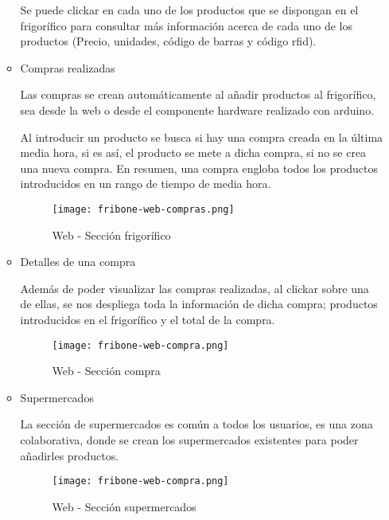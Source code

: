 \begin{itemize}
\begin{itemize}
                Se puede clickar en cada uno de los productos que se dispongan en el frigorífico para consultar más información acerca de cada uno de los productos (Precio, unidades, código de barras y código rfid).

                \item Compras realizadas

                Las compras se crean automáticamente al añadir productos al frigorífico, sea desde la web o desde el componente hardware realizado con arduino.

                Al introducir un producto se busca si hay una compra creada en la última media hora, si es así, el producto se mete a dicha compra, si no se crea una nueva compra. En resumen, una compra engloba todos los productos introducidos en un rango de tiempo de media hora.

                \begin{figure}[H]
                    \centering
                    \texttt{[image: fribone-web-compras.png]}
                    \caption{Web - Sección frigorífico}\label{fig:fribone-web-comras}
                \end{figure}

                \item Detalles de una compra

                Además de poder visualizar las compras realizadas, al clickar sobre una de ellas, se nos despliega toda la información de dicha compra; productos introducidos en el frigorífico y el total de la compra.

                \begin{figure}[H]
                    \centering
                    \texttt{[image: fribone-web-compra.png]}
                    \caption{Web - Sección compra}\label{fig:fribone-web-compra}
                \end{figure}

                \item Supermercados

                    La sección de supermercados es común a todos los usuarios, es una zona colaborativa, donde se crean los supermercados existentes para poder añadirles productos.

                    \begin{figure}[H]
                        \centering
                        \texttt{[image: fribone-web-compra.png]}
                        \caption{Web - Sección supermercados}\label{fig:fribone-web-supermercados}
                    \end{figure}


\end{itemize}
\end{itemize}
